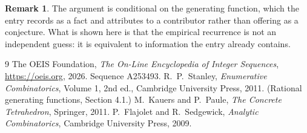 \documentclass[11pt,a4paper]{article}
\theoremstyle{plain}
\theoremstyle{definition}
\newtheorem{remark}[theorem]{Remark}
\begin{document}
\begin{remark}
The argument is conditional on the generating function, which the entry records as a fact and
attributes to a contributor rather than offering as a conjecture. What is shown here is that
the empirical recurrence is not an independent guess: it is equivalent to information the
entry already contains.
\end{remark}

\begin{thebibliography}{9}
 The OEIS Foundation, \emph{The On-Line Encyclopedia of Integer
Sequences}, \url{https://oeis.org}, 2026. Sequence A253493.
 R.~P.~Stanley, \emph{Enumerative Combinatorics}, Volume 1, 2nd ed.,
Cambridge University Press, 2011. (Rational generating functions, Section 4.1.)
 M.~Kauers and P.~Paule, \emph{The Concrete Tetrahedron}, Springer, 2011.
 P.~Flajolet and R.~Sedgewick, \emph{Analytic Combinatorics}, Cambridge
University Press, 2009.
\end{thebibliography}
\end{document}
